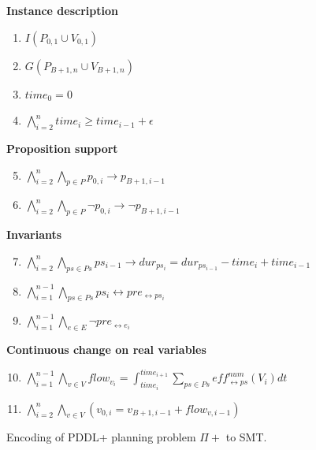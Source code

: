 \begin{figure}[thb]
\begin{minipage}[t]{0.39\linewidth}
\textbf{Instance description}
\begin{enumerate}[label=P\arabic*.]
  \item $I(P_{0,1}\cup V_{0,1})$
  \item $G(P_{B+1,n}\cup V_{B+1,n})$
  \item $time_0 = 0$
  \item $\bigwedge_{i=2}^n time_i \geq time_{i-1}+\epsilon$
\end{enumerate}
\textbf{Proposition support}
\begin{enumerate}[label=P\arabic*.]\setcounter{enumi}{4}
  \item $\bigwedge_{i=2}^n \bigwedge_{p\in P} p_{0,i} \rightarrow p_{B+1,i-1}$
  \item $\bigwedge_{i=2}^n \bigwedge_{p\in P} \neg p_{0,i} \rightarrow \neg p_{B+1,i-1}$
\end{enumerate}
\end{minipage}
\begin{minipage}[t]{0.6\linewidth}
\textbf{Invariants}
\begin{enumerate}[label=P\arabic*.]\setcounter{enumi}{6}
  \item $\bigwedge_{i=2}^n \bigwedge_{ps\in Ps} ps_{i-1} \rightarrow dur_{ps_i} = dur_{ps_{i-1}} - time_i + time_{i-1}$
  \item $\bigwedge_{i=1}^{n-1} \bigwedge_{ps \in Ps}  ps_i \leftrightarrow pre_{\leftrightarrow ps_i}$
  \item $\bigwedge_{i=1}^{n-1} \bigwedge_{e\in E} \neg pre_{\leftrightarrow e_i}$
\end{enumerate}
\textbf{Continuous change on real variables}
\begin{enumerate}[label=P\arabic*.]\setcounter{enumi}{9}
  \item $\bigwedge_{i=1}^{n-1} \bigwedge_{v\in V} flow_{v_i} = \int^{time_{i+1}}_{time_i} \sum_{ps\in Ps} eff^{num}_{\leftrightarrow ps}(V_i)dt$
  \item $\bigwedge_{i=2}^n \bigwedge_{v\in V} (v_{0,i} = v_{B+1,i-1} + flow_{v,i-1})$
\end{enumerate}
\end{minipage}
\caption{Encoding of PDDL+ planning problem $\Pi+$ to SMT.}
\label{eq:plan}
\end{figure}

